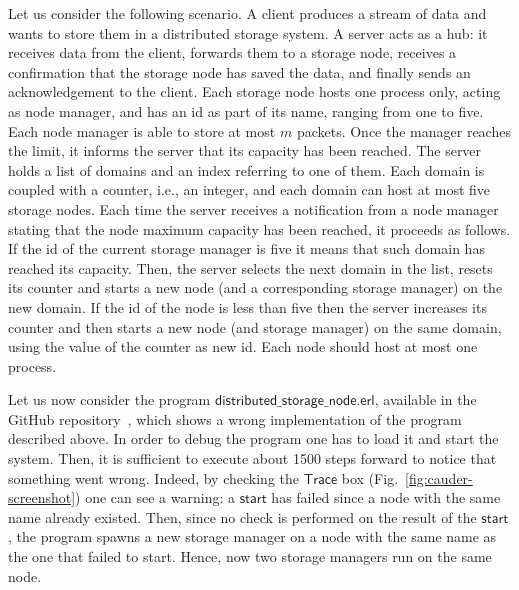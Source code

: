 \documentclass[runningheads]{llncs}
\newcommand{\ms}[1]{\mathsf{#1}}
\begin{document}
Let us consider the following scenario. A client produces a stream of data and wants to store them in a distributed storage system.
A server acts as a hub: it receives data from the client, forwards them to a storage node, receives a confirmation that the storage node has saved the data, and finally sends an acknowledgement to the client.
Each storage node hosts one process only, acting as node manager, and has an id as part of its name, ranging from one to five. Each node manager is able to store at most $m$ packets. Once the manager reaches the limit, it informs the server that its capacity has been reached.
The server holds a list of domains and an index referring to one of them.  
Each domain is coupled with a counter, i.e., an integer,
and each domain can host at most five storage nodes.  Each time the
server receives a notification from a node manager stating that the
node maximum capacity has been reached, it proceeds as follows. If the
id of the current storage manager is five it means that such domain
has reached its capacity. Then, the server selects the next domain in
the list, resets its counter and starts a new node (and a
corresponding storage manager) on the new domain. If the id of the
node is less than five then the server increases its counter and then
starts a new node (and storage manager) on the same domain, using the
value of the counter as new id. Each node should host at most one
process.

Let us now consider the program $\ms{distributed\_storage\_node.erl}$,
available in the GitHub repository~\cite{DistCauder}, which shows a wrong
implementation of the program described above. In order to debug the program one
has to load it and start the system. Then, it is sufficient to execute
about 1500 steps forward to notice that something went wrong. Indeed, by checking
the $\ms{Trace}$ box (Fig.~\ref{fig:cauder-screenshot}) one can see a warning: 
a $\ms{start}$ has failed since a node with the same name already existed.
Then, since no check is performed on
the result of the $\ms{start}$, the program spawns a new storage manager on
a node with the same name as the one 
that failed to start. Hence, now two
storage managers run on the same node. 
\end{document}
